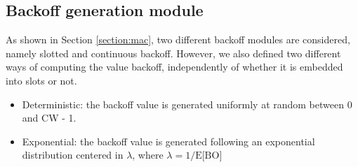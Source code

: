 \documentclass[a4paper]{article}
\begin{document}
\subsection{Backoff generation module}
As shown in Section \ref{section:mac}, two different backoff modules are considered, namely slotted and continuous backoff. However, we also defined two different ways of computing the value backoff, independently of whether it is embedded into slots or not.
\begin{itemize}
	\item Deterministic: the backoff value is generated uniformly at random between 0 and CW - 1.
	\item Exponential: the backoff value is generated following an exponential distribution centered in $\lambda$, where $\lambda = 1/\text{E[BO]}$
\end{itemize}
\end{document}

